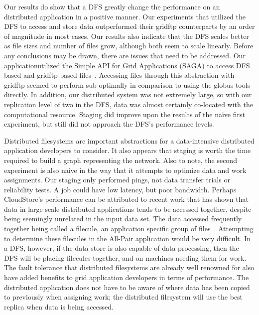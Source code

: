 \documentclass[a4paper,11pt]{article}
\begin{document}
Our results do show that a DFS greatly change the performance on an distributed application in a positive manner. Our experiments that utilized the DFS to access and store data outperformed their gridftp counterparts by an order of magnitude in most cases. Our results also indicate that the DFS scales better as file sizes and number of files grow, although both seem to scale linearly. Before any conclusions may be drawn, there are issues that need to be addressed. Our applicationutilized the Simple API for Grid Applications (SAGA) to access DFS based and gridftp based files~\cite{saga_web}. Accessing files through this abstraction with gridftp seemed to perform sub-optimally in comparison to using the globus tools directly. In addition, our distributed system was not extremely large, so with our replication level of two in the DFS, data was almost certainly co-located with the computational resource. Staging did improve upon the results of the naïve first experiment, but still did not approach the DFS's performance levels. 

Distributed filesystems are important abstractions for a data-intensive distributed application developers to consider. It also appears that staging is worth the time required to build a graph representing the network. Also to note, the second experiment is also naive in the way that it attempts to optimize data and work assignments. Our staging only performed pings, not data transfer trials or reliability tests. A job could have low latency, but poor bandwidth. Perhaps CloudStore's performance can be attributed to recent work that has shown that data in large scale distributed applications tends to be accessed together, despite being seemingly unrelated in the input data set. The data accessed frequently together being called a filecule, an application specific group of files~\cite{filecule}. Attempting to determine these filecules in the All-Pair application would be very difficult. In a DFS, however, if the data store is also capable of data processing, then the DFS will be placing filecules together, and on machines needing them for work. The fault tolerance that distributed filesystems are already well renowned for also have added benefits to grid application developers in terms of performance. The distributed application does not have to be aware of where data has been copied to previously when assigning work; the distributed filesystem will use the best replica when data is being accessed.

 

\end{document}
